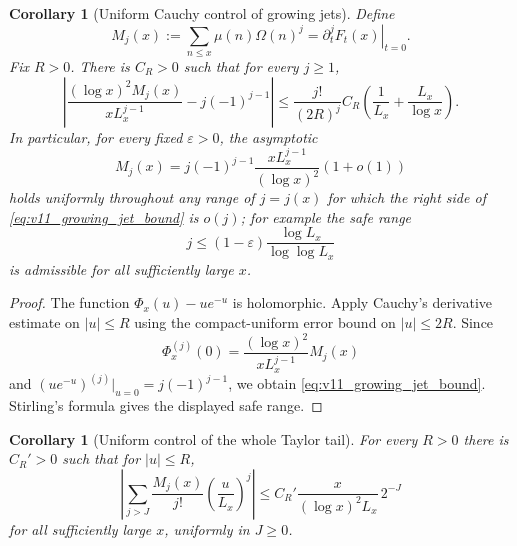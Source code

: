\documentclass[11pt]{amsart}
\numberwithin{equation}{section}
\theoremstyle{plain}
\newtheorem{corollary}[theorem]{Corollary}
\theoremstyle{definition}
\theoremstyle{remark}
\begin{document}
\begin{corollary}[Uniform Cauchy control of growing jets]
\label{cor:v11_cauchy_jets}
Define
\begin{equation}
M_j(x):=\sum_{n\le x}\mu(n)\Omega(n)^j
=\left.\partial_t^jF_t(x)\right|_{t=0}.
\label{eq:v11_Mj}
\end{equation}
Fix \(R>0\).  There is \(C_R>0\) such that for every \(j\ge1\),
\begin{equation}
\boxed{
\left|
\frac{(\log x)^2M_j(x)}{xL_x^{j-1}}
-j(-1)^{j-1}
\right|
\le
\frac{j!}{(2R)^j}C_R
\left(\frac1{L_x}+\frac{L_x}{\log x}\right).}
\label{eq:v11_growing_jet_bound}
\end{equation}
In particular, for every fixed \(\varepsilon>0\), the asymptotic
\begin{equation}
M_j(x)
=j(-1)^{j-1}\frac{xL_x^{j-1}}{(\log x)^2}(1+o(1))
\label{eq:v11_growing_jet_asymptotic}
\end{equation}
holds uniformly throughout any range of \(j=j(x)\) for which the right side
of \eqref{eq:v11_growing_jet_bound} is \(o(j)\); for example the safe range
\begin{equation}
j\le(1-\varepsilon)
\frac{\log L_x}{\log\log L_x}
\label{eq:v11_safe_j_range}
\end{equation}
is admissible for all sufficiently large \(x\).
\end{corollary}

\begin{proof}
The function \(\Phi_x(u)-ue^{-u}\) is holomorphic.  Apply Cauchy's derivative
estimate on \(|u|\le R\) using the compact-uniform error bound on
\(|u|\le2R\).  Since
\begin{equation}
\Phi_x^{(j)}(0)
=\frac{(\log x)^2}{xL_x^{j-1}}M_j(x)
\label{eq:v11_Phi_derivative_Mj}
\end{equation}
and
\((ue^{-u})^{(j)}|_{u=0}=j(-1)^{j-1}\), we obtain
\eqref{eq:v11_growing_jet_bound}.  Stirling's formula gives the displayed
safe range.
\end{proof}

\begin{corollary}[Uniform control of the whole Taylor tail]
\label{cor:v11_full_jet_tail}
For every \(R>0\) there is \(C_R'>0\) such that for \(|u|\le R\),
\begin{equation}
\boxed{
\left|
\sum_{j>J}\frac{M_j(x)}{j!}
\left(\frac{u}{L_x}\right)^j
\right|
\le
C_R'\frac{x}{(\log x)^2L_x}\,2^{-J}}
\label{eq:v11_full_jet_tail}
\end{equation}
for all sufficiently large \(x\), uniformly in \(J\ge0\).
\end{corollary}
\end{document}

